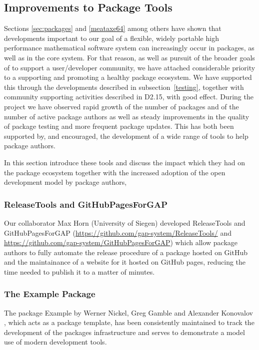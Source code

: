 \subsection{Improvements to \GAP Package Tools}\label{sec:package-tools}

Sections \ref{sec:packages} and \ref{meataxe64} among others have shown
that developments important to our goal of a flexible, widely portable high performance
mathematical software system can increasingly occur in packages, as
well as in the core \GAP system. For that reason, as well as pursuit
of the broader goals of \ODK to support a user/developer community, we have attached
considerable priority to a supporting and promoting a healthy \GAP
package ecosystem. We have supported this through the developments
described in subsection~\ref{testing}, together with community
supporting activities described in D2.15,  with
good effect. During the \ODK
project we have observed rapid growth of the number of \GAP packages
and of the number of active package
authors as well as steady improvements in the quality of package testing and more frequent
package updates. This has both been supported by, and encouraged, the
development of a wide range of tools to help package authors.

In this section introduce these tools and discuss the
impact which they had on the package ecosystem together with the increased
adoption of the open development model by package authors,

\subsubsection{ReleaseTools and GitHubPagesForGAP}
Our collaborator Max Horn (University of Siegen) developed {\sf ReleaseTools}
and {\sf GitHubPagesForGAP} (\url{https://github.com/gap-system/ReleaseTools/}
and \url{https://github.com/gap-system/GitHubPagesForGAP}) which allow package
authors to fully automate the release procedure of a \GAP package hosted on GitHub
and the maintainance of a website for it hosted on GitHub pages,
reducing the time needed to publish it to a matter of minutes.

\subsubsection{The Example Package}
The \GAP package {\sf Example} by Werner Nickel, Greg Gamble and
Alexander Konovalov \cite{example}, which acts as a package template,
has been consistently maintained to track the development of
the packages infrastructure and serves to demonstrate a model use of modern
development tools.

